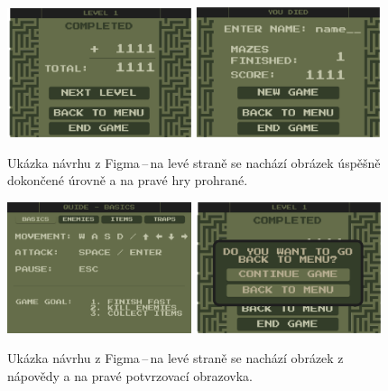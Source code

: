 \begin{figure}[H]
    \centering
    \includegraphics[width=0.482\textwidth]{obrazky-figures/ch3/level_completed_screen.png}\hspace{0.1cm}
    \includegraphics[width=0.48\textwidth]{obrazky-figures/ch3/end_game_screen.png}
    \caption{Ukázka návrhu z Figma\,--\,na levé straně se nachází obrázek úspěšně dokončené úrovně a na pravé hry prohrané.}
    \label{fig:end_level_game}
\end{figure}


\begin{figure}[H]
    \centering
    \includegraphics[width=0.48\textwidth]{obrazky-figures/ch3/Quide - Basics.png}\hspace{0.1cm}
    \includegraphics[width=0.486\textwidth]{obrazky-figures/ch3/level_completed_affirming_menu.png}
    \caption{Ukázka návrhu z Figma\,--\,na levé straně se nachází obrázek z nápovědy a na pravé potvrzovací obrazovka.}
    \label{fig:information_screen}
\end{figure}



